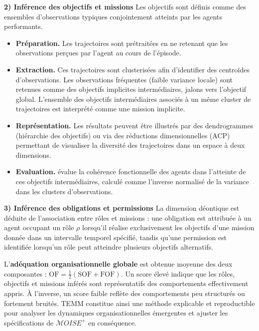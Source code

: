 \documentclass[francais,ROIA,Unicode,manuscript]{cedram}
\begin{document}
\noindent
\textbf{2) Inférence des objectifs et missions} \quad
Les objectifs sont définis comme des ensembles d’observations typiques conjointement atteints par les agents performants.
\begin{itemize}
    \item \textbf{Préparation.} Les trajectoires sont prétraitées en ne retenant que les observations perçues par l'agent au cours de l’épisode.
    \item \textbf{Extraction.} Ces trajectoires sont clusterisées afin d’identifier des centroïdes d’observations. Les observations fréquentes (faible variance locale) sont retenues comme des objectifs implicites intermédiaires, jalons vers l’objectif global. L'ensemble des objectifs intermédiaires associés à un même cluster de trajectoires est interprété comme une mission implicite.
    \item \textbf{Représentation.} Les résultats peuvent être illustrés par des dendrogrammes (hiérarchie des objectifs) ou via des réductions dimensionnelles (ACP) permettant de visualiser la diversité des trajectoires dans un espace à deux dimensions.
    \item \textbf{Evaluation.} évalue la cohérence fonctionnelle des agents dans l’atteinte de ces objectifs intermédiaires, calculé comme l’inverse normalisé de la variance dans les clusters d’observations.
\end{itemize}

\noindent
\textbf{3) Inférence des obligations et permissions} \quad
La dimension déontique est déduite de l’association entre rôles et missions : une obligation est attribuée à un agent occupant un rôle \(\rho\) lorsqu’il réalise exclusivement les objectifs d’une mission donnée dans un intervalle temporel spécifié, tandis qu’une permission est identifiée lorsqu’un rôle peut atteindre plusieurs objectifs alternatifs.

L’\textbf{adéquation organisationnelle globale} est obtenue moyenne des deux composantes :
%
$\text{OF} = \tfrac{1}{2}\left( \text{SOF} + \text{FOF} \right)$.
%
Un score élevé indique que les rôles, objectifs et missions inférés sont représentatifs des comportements effectivement appris. À l’inverse, un score faible reflète des comportements peu structurés ou fortement bruités. TEMM constitue ainsi une méthode explicable et reproductible pour analyser les dynamiques organisationnelles émergentes et ajuster les spécifications de \(\mathcal{M}OISE^+\) en conséquence.

\medskip
\end{document}
